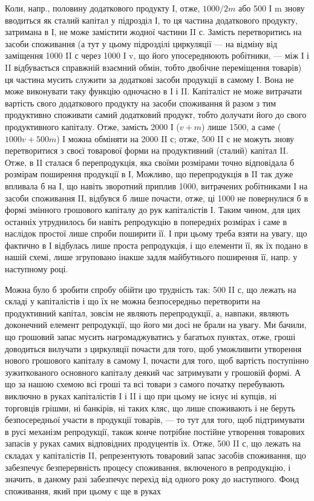 Коли, напр., половину додаткового продукту І, отже, $1000/2 m$ або
500 І m знову вводиться як сталий капітал у підрозділ І, то ця частина
додаткового продукту, затримана в І, не може замістити жодної частини
II с. Замість перетворитись на засоби споживання (а тут у цьому підрозділі
циркуляції — на відміну від заміщення 1000 II с через 1000 І v,
що його упосереднюють робітники, — між І і II відбувається справжній
взаємний обмін, тобто двобічне переміщення товарів) ця частина мусить
служити за додаткові засоби продукції в самому І. Вона не може виконувати
таку функцію одночасно в І і II. Капіталіст не може витрачати
вартість свого додаткового продукту на засоби споживання й разом
з тим продуктивно споживати самий додатковий продукт, тобто долучати
його до свого продуктивного капіталу. Отже, замість 2000 І ($v + m$)
лише 1500, а саме ($1000 v + 500 m$) І можна обміняти на 2000 II с;
отже, 500 II с не можуть знову перетворитися з своєї товарової форми
на продуктивний (сталий) капітал II. Отже, в II сталася б перепродукція,
яка своїми розмірами точно відповідала б розмірам поширення продукції
в І, Можливо, що перепродукція в II так дуже впливала б на І,
що навіть зворотний приплив 1000, витрачених робітниками І на засоби
споживання II, відбувся б лише почасти, отже, ці 1000 не повернулися б
в формі змінного грошового капіталу до рук капіталістів І. Таким чином,
для цих останніх утруднилось би навіть репродукцію в попередніх
розмірах і саме в наслідок простої лише спроби поширити її. І при цьому
треба взяти на увагу, що фактично в І відбулась лише проста репродукція,
і що елементи її, як їх подано в нашій схемі, лише згруповано інакше
задля майбутнього поширення її, напр. у наступному році.

Можна було б зробити спробу обійти цю трудність так: 500 II с,
що лежать на складі у капіталістів і що їх не можна безпосередньо
перетворити на продуктивний капітал, зовсім не являють перепродукції,
а, навпаки, являють доконечний елемент репродукції, що його ми досі
не брали на увагу. Ми бачили, що грошовий запас мусить нагромаджуватись
у багатьох пунктах, отже, гроші доводиться вилучати з циркуляції
почасти для того, щоб уможливити утворення нового грошового
капіталу в самому І, почасти для того, щоб вартість поступінно
зужиткованого основного капіталу деякий час затримувати у грошовій
формі. А що за нашою схемою всі гроші та всі товари з самого
початку перебувають виключно в руках капіталістів І і II і що
при цьому не існує ні купців, ні торговців грішми, ні банкірів, ні таких
кляс, що лише споживають і не беруть безпосередньої участи в продукції
товарів, — то тут для того, щоб підтримувати в русі механізм репродукції,
також конче потрібне постійне утворення товарових запасів
у руках самих відповідних продуцентів їх. Отже, 500 II с, що лежать
на складах у капіталістів II, репрезентують товаровий запас засобів споживання,
що забезпечує безперервність процесу споживання, включеного
в репродукцію, і значить, в даному разі забезпечує перехід від одного
року до наступного. Фонд споживання, який при цьому є ще в руках
\parbreak{}  %

